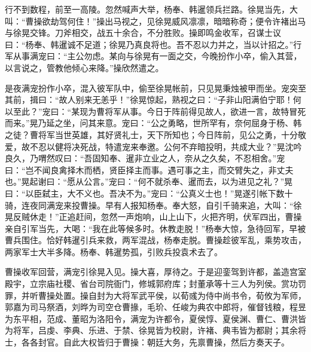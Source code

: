 行不到数程，前至一高陵。忽然喊声大举，杨奉、韩暹领兵拦路。徐晃当先，大叫：“曹操欲劫驾何住！”操出马视之，见徐晃威风凛凛，暗暗称奇；便令许褚出马与徐晃交锋。刀斧相交，战五十余合，不分胜败。操即鸣金收军，召谋士议曰：“杨奉、韩暹诚不足道；徐晃乃真良将也。吾不忍以力并之，当以计招之。”行军从事满宠曰：“主公勿虑。某向与徐晃有一面之交，今晚扮作小卒，偷入其营，以言说之，管教他倾心来降。”操欣然遣之。

是夜满宠扮作小卒，混入彼军队中，偷至徐晃帐前，只见晃秉烛被甲而坐。宠突至其前，揖曰：“故人别来无恙乎！”徐晃惊起，熟视之曰：“子非山阳满伯宁耶！何以至此？”宠曰：“某现为曹将军从事。今日于阵前得见故人，欲进一言，故特冒死而来。”晃乃延之坐，问其来意。宠曰：“公之勇略，世所罕有，奈何屈身于杨、韩之徒？曹将军当世英雄，其好贤礼士，天下所知也；今日阵前，见公之勇，十分敬爱，故不忍以健将决死战，特遣宠来奉邀。公何不弃暗投明，共成大业？”晃沈吟良久，乃喟然叹曰：“吾固知奉、暹非立业之人，奈从之久矣，不忍相舍。”宠曰：“岂不闻良禽择木而栖，贤臣择主而事。遇可事之主，而交臂失之，非丈夫也。”晃起谢曰：“愿从公言。”宠曰：“何不就杀奉、暹而去，以为进见之礼？”晃曰：“以臣弑主，大不义也。吾决不为。”宠曰：“公真义士也！”晃遂引帐下数十骑，连夜同满宠来投曹操。早有人报知杨奉。奉大怒，自引千骑来追，大叫：“徐晃反贼休走！”正追赶间，忽然一声炮响，山上山下，火把齐明，伏军四出，曹操亲自引军当先，大喝：“我在此等候多时。休教走脱！”杨奉大惊，急待回军，早被曹兵围住。恰好韩暹引兵来救，两军混战，杨奉走脱。曹操趁彼军乱，乘势攻击，两家军士大半多降。杨奉、韩暹势孤，引败兵投袁术去了。

曹操收军回营，满宠引徐晃入见。操大喜，厚待之。于是迎銮驾到许都，盖造宫室殿宇，立宗庙社稷、省台司院衙门，修城郭府库；封董承等十三人为列侯。赏功罚罪，并听曹操处置。操自封为大将军武平侯，以荀彧为侍中尚书令，荀攸为军师，郭嘉为司马祭酒，刘晔为司空仓曹掾，毛玠、任峻为典农中郎将，催督钱粮，程昱为东平相，范成、董昭为洛阳令，满宠为许都令，夏侯惇、夏侯渊、曹仁、曹洪皆为将军，吕虔、李典、乐进、于禁、徐晃皆为校尉，许褚、典韦皆为都尉；其余将士，各各封官。自此大权皆归于曹操：朝廷大务，先禀曹操，然后方奏天子。

